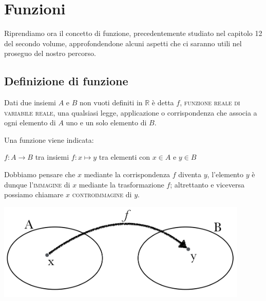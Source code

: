 

\chapter{Funzioni}

Riprendiamo ora il concetto di funzione, precedentemente studiato nel capitolo 
12 del secondo volume, approfondendone alcuni aspetti che ci saranno utili nel 
proseguo del nostro percorso.

\section{Definizione di funzione}
\begin{definizione}
  Dati due insiemi \(A\) e \(B\) non vuoti definiti in \(\mathbb{R}\) è detta 
\(f\), \textsc{funzione reale di variabile reale}, una qualsiasi legge, 
applicazione o corrispondenza che associa a ogni elemento di \(A\) uno e un 
solo elemento di \(B\).
\end{definizione}

\begin{minipage}{.39\textwidth}
Una funzione viene indicata:

\(f: A\to B  \)  tra insiemi   \(f: x\mapsto y\)   tra elementi  con \(x\in A 
\)  e \(y\in B\)

Dobbiamo pensare che \(x\) mediante la corrispondenza \(f\) diventa \(y\), 
l'elemento \(y\) è dunque l'\textsc{immagine} di \(x\) mediante la 
trasformazione 
\(f\); altrettanto e viceversa possiamo chiamare \(x\) \textsc{controimmagine} 
di 
\(y\).
\end{minipage}
\begin{minipage}{.59\textwidth}
\begin{center}
  \includegraphics[width=0.9\textwidth]{img/1_funz.png}
\end{center}
\end{minipage}

